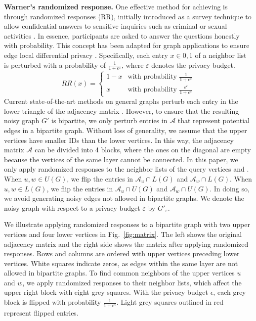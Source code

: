 \noindent
{\bf Warner's randomized response. }
One effective method for achieving \epldp is through randomized responses (RR), initially introduced as a survey technique to allow confidential answers to sensitive inquiries such as criminal or sexual activities \cite{warner1965randomized}. 
In essence, participants are asked to answer the questions honestly with probability. 
This concept has been adapted for graph applications to ensure edge local differential privacy \cite{qin_generating_2017, imola2021locally}. 
Specifically, each entry $x \in {0,1}$ of a neighbor list is perturbed with a probability of $\frac{1}{1+e^{\varepsilon}}$, where $\varepsilon$ denotes the privacy budget. 
$$
RR(x) = \begin{cases} 
1-x & \text{with probability } \frac{1}{1+e^{\varepsilon}} \\
x & \text{with probability } \frac{e^{\varepsilon}}{1+e^{\varepsilon}}
\end{cases}
$$
Current state-of-the-art methods on general graphs perturb each entry in the lower triangle of the adjacency matrix \cite{imola2021locally,imola2022communication}. 
However, to ensure that the resulting noisy graph $G'$ is bipartite, we only perturb entries in $\mathcal{A}$ that represent potential edges in a bipartite graph. 
Without loss of generality, we assume that the upper vertices have smaller IDs than the lower vertices. 
In this way, the adjacency matrix $\mathcal{A}$ can be divided into 4 blocks, where the ones on the diagonal are empty because the vertices of the same layer cannot be connected. 
In this paper, we only apply randomized responses to the neighbor lists of the query vertices \vq and \vx. 
When $u, w \in U(G)$, we flip the entries in $\mathcal{A}_u \cap L(G)$ and $\mathcal{A}_w \cap L(G)$. 
When $u, w \in L(G)$, we flip the entries in $\mathcal{A}_u \cap U(G)$ and $\mathcal{A}_w \cap U(G)$. 
In doing so, we avoid generating noisy edges not allowed in bipartite graphs. 
We denote the noisy graph with respect to a privacy budget $\varepsilon$ by $G'_{\varepsilon}$.
\begin{example}
We illustrate applying randomized responses to a bipartite graph with two upper vertices and four lower vertices in Fig.~\ref{fig:matrix}. 
The left shows the original adjacency matrix and the right side shows the matrix after applying randomized responses. 
Rows and columns are ordered with upper vertices preceding lower vertices. 
White squares indicate zeros, as edges within the same layer are not allowed in bipartite graphs. 
To find common neighbors of the upper vertices $u$ and $w$, we apply randomized responses to their neighbor lists, which affect the upper right block with eight grey squares. 
With the privacy budget \(\epsilon\), each grey block is flipped with probability \(\frac{1}{1 + e^{\epsilon}}\). Light grey squares outlined in red represent flipped entries.
\end{example}


